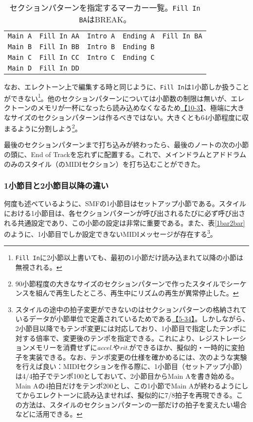 \documentclass[uplatex, 10pt, dvipdfmx]{jsarticle}
\numberwithin{equation}{section}
\begin{document}
\begin{table}[h]
\caption{セクションパターンを指定するマーカー一覧\cite{style}。\texttt{Fill In BA}はBREAK。}
\label{marker}
\centering
\begin{tabular}{|c|c|c|c|c|}
\hline
\texttt{Main A} & \texttt{Fill In AA} & \texttt{Intro A} & \texttt{Ending A} & \texttt{Fill In BA} \\
\texttt{Main B} & \texttt{Fill In BB} & \texttt{Intro B} & \texttt{Ending B} & \\
\texttt{Main C} & \texttt{Fill In CC} & \texttt{Intro C} & \texttt{Ending C} & \\
\texttt{Main D} & \texttt{Fill In DD} & & & \\
\hline
\end{tabular}
\end{table}

なお、エレクトーン上で編集する時と同じように、\texttt{Fill In}は1小節しか扱うことができない\footnote{\texttt{Fill In}に2小節以上書いても、最初の1小節だけ読み込まれて以降の小節は無視される。}。他のセクションパターンについては小節数の制限は無いが、エレクトーンのメモリが一杯になったら読み込めなくなるため\href{http://els01stylefile.music.coocan.jp/Stagea_Style/Stagea_Style_P1003.htm}{【10-3】}、極端に大きなサイズのセクションパターンは作るべきではない。大きくとも64小節程度に収まるように分割しよう\footnote{90小節程度の大きなサイズのセクションパターンで作ったスタイルでシーケンスを組んで再生したところ、再生中にリズムの再生が異常停止した。}。

最後のセクションパターンまで打ち込みが終わったら、最後のノートの次の小節の頭に、End of Trackを忘れずに配置する。これで、メインドラムとアドドラムのみのスタイル（のMIDIセクション）を打ち込むことができた。

\subsubsection{1小節目と2小節目以降の違い}

何度も述べているように、SMFの1小節目はセットアップ小節である。スタイルにおける1小節目は、各セクションパターンが呼び出されるたびに必ず呼び出される共通設定であり、この小節の設定は非常に重要である。また、表\ref{1bar2bar}のように、1小節目でしか設定できないMIDIメッセージが存在する\cite{style}\footnote{スタイルの途中の拍子変更ができないのはセクションパターンの格納されているデータが小節単位で定義されているためである\href{http://els01stylefile.music.coocan.jp/Stagea_Style/Stagea_Style_P34.htm}{【5-34】}。しかしながら、2小節目以降でもテンポ変更には対応しており、1小節目で指定したテンポに対する倍率で、変更後のテンポを指定できる。これにより、レジストレーションメモリーを消費せずに\textit{accel.}や\textit{rit.}ができるほか、擬似的・一時的に変拍子を実装できる。なお、テンポ変更の仕様を確かめるには、次のような実験を行えば良い：MIDIセクションを作る際に、1小節目（セットアップ小節）は4/4拍子でテンポ100としておいて、2小節目からMain Aを書き始める。Main Aの4拍目だけをテンポ200とし、この1小節でMain Aが終わるようにしてからエレクトーンに読み込ませれば、擬似的に7/8拍子を再現できる。この方法は、スタイルのセクションパターンの一部だけの拍子を変えたい場合などに活用できる。}。
\end{document}
